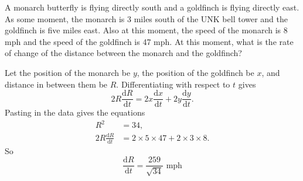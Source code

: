 \documentclass[12pt,fleqn,answers]{exam}
\begin{document}
\begin{questions}
  \question A monarch butterfly is flying directly south and a goldfinch is flying directly 
  east.  As some moment, the monarch is 3 miles south of the UNK bell tower and the goldfinch
  is five miles east. Also at this moment, the speed of the monarch is 8 mph and the 
  speed of the goldfinch is 47 mph.  At this moment, what is the rate of change of
  the distance between the monarch and the goldfinch?

\begin{solution}
  Let the position of the monarch be $y$, the position of 
  the goldfinch be $x$, and distance in between them be $R$.
  Differentiating with respect to $t$ gives
  \begin{equation}
    2 R \frac{\mathrm{d} R}{\mathrm{d} t} =
    2 x \frac{\mathrm{d} x}{\mathrm{d} t}
    + 2 y \frac{\mathrm{d} y}{\mathrm{d} t}.
      \end{equation}
Pasting in the data gives the equations
\begin{align*}
     R^2 &= 34, \\
     2 R \frac{\mathrm{d} R}{\mathrm{d} t} &=
     2 \times 5 \times 47
     + 2 \times 3  \times 8.
\end{align*}
So
\[
  \frac{\mathrm{d} R}{\mathrm{d} t} =  \frac{259}{\sqrt{34}} \,\, \mbox{mph}
\]
\end{solution}
\end{questions}
\end{document}
